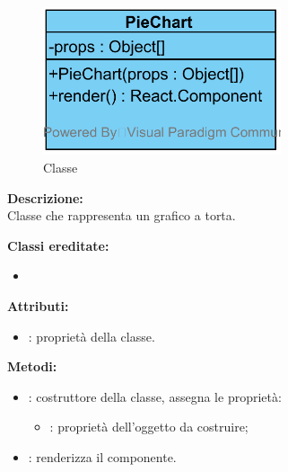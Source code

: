 \paragraph[::PieChart]{\class}\mbox{}\\ \label{\class}
\begin{figure}[H]
	\centering
	\includegraphics[width=7cm]{./diagrammi/framework/view/gui/piechart.png}
	\caption{Classe \class}
\end{figure}
\textbf{Descrizione:}\\
Classe che rappresenta un grafico a torta.


\textbf{Classi ereditate:}
\begin{itemize}
	\item {}
\end{itemize}


\textbf{Attributi:}
\begin{itemize}
	\item {}: proprietà della classe.
\end{itemize}

\textbf{Metodi:}
\begin{itemize}
	\item {}: costruttore della classe, assegna le proprietà:
	\begin{itemize}
		\item {}: proprietà dell'oggetto da costruire;
	\end{itemize}
	\item {}: renderizza il componente.
\end{itemize}


